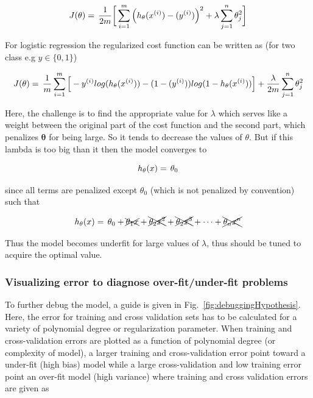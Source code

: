 \begin{equation}{\label{eqn:costFuncRegularized}}
J(\theta)
=\,
\frac{1}{2m} \bigg[ \sum\limits_{i=1}^{m} \Big(h_\theta(x^{(i)}) - (y^{(i)})\Big)^2 +\lambda \sum\limits_{j=1}^{n} \theta_j^2 \bigg] 
\end{equation} 

For logistic regression the regularized cost function can be written as (for two class e.g $y \in \{0,1\}$)

\begin{equation}{\label{eqn:costFuncLogisticRegression}}
J(\theta)
=\,
\frac{1}{m} \sum\limits_{i=1}^{m} \Big[-y^{(i)}log(h_\theta(x^{(i)})) - (1-(y^{(i)}))log(1-h_\theta(x^{(i)}))\Big] +\frac{\lambda}{2m} \sum\limits_{j=1}^{n} \theta_j^2
\end{equation} 

Here, the challenge is to find the appropriate value for $\lambda$ which serves like a weight between the original part of the cost function and the second part, which penalizes $\bm{\theta}$ for being large. 
So it tends to decrease the values of $\theta$. But if this lambda is too big than it then the model converges to  

\begin{equation}{\label{eqn:costFuncRegularizedTooMuch}}
h_\theta(x)
=\,
\theta_0 
\end{equation} 

since all terms are penalized except $\theta_0$ (which is not penalized by convention) such that

\begin{equation}{\label{eqn:costFuncRegularizedTooMuchHow}}
h_\theta(x)
=\,
\theta_0 + \xcancel{\theta_1 x}  + \xcancel{\theta_2 x^2}  + \xcancel{\theta_2 x^3}  + \cdots + \xcancel{\theta_n x^n}
\end{equation} 

Thus the model becomes underfit for large values of $\lambda$, thus should be tuned to acquire the optimal value.


\subsubsection{Visualizing error to diagnose over-fit/under-fit problems}

To further debug the model, a guide is given in Fig.~\ref{fig:debuggingHypothesis}. 
Here, the error for training and cross validation sets has to be calculated for a variety of polynomial degree or regularization parameter. 
When training and cross-validation errors are plotted as a function of polynomial degree (or complexity of model), a larger training and cross-validation error point toward a under-fit (high bias) model while a large cross-validation and low training error point an over-fit model (high variance) where training and cross validation errors are given as

